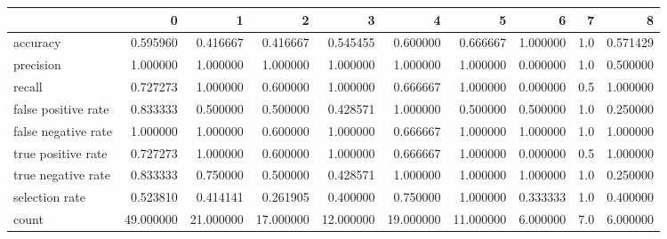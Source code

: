 \begin{tabular}{lrrrrrrrrr}
\toprule
{} &          0 &          1 &          2 &          3 &          4 &          5 &         6 &    7 &         8 \\
\midrule
accuracy            &   0.595960 &   0.416667 &   0.416667 &   0.545455 &   0.600000 &   0.666667 &  1.000000 &  1.0 &  0.571429 \\
precision           &   1.000000 &   1.000000 &   1.000000 &   1.000000 &   1.000000 &   1.000000 &  0.000000 &  1.0 &  0.500000 \\
recall              &   0.727273 &   1.000000 &   0.600000 &   1.000000 &   0.666667 &   1.000000 &  0.000000 &  0.5 &  1.000000 \\
false positive rate &   0.833333 &   0.500000 &   0.500000 &   0.428571 &   1.000000 &   0.500000 &  0.500000 &  1.0 &  0.250000 \\
false negative rate &   1.000000 &   1.000000 &   0.600000 &   1.000000 &   0.666667 &   1.000000 &  1.000000 &  1.0 &  1.000000 \\
true positive rate  &   0.727273 &   1.000000 &   0.600000 &   1.000000 &   0.666667 &   1.000000 &  0.000000 &  0.5 &  1.000000 \\
true negative rate  &   0.833333 &   0.750000 &   0.500000 &   0.428571 &   1.000000 &   1.000000 &  1.000000 &  1.0 &  0.250000 \\
selection rate      &   0.523810 &   0.414141 &   0.261905 &   0.400000 &   0.750000 &   1.000000 &  0.333333 &  1.0 &  0.400000 \\
count               &  49.000000 &  21.000000 &  17.000000 &  12.000000 &  19.000000 &  11.000000 &  6.000000 &  7.0 &  6.000000 \\
\bottomrule
\end{tabular}
